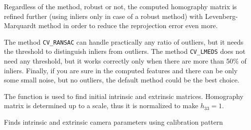 Regardless of the method, robust or not, the computed homography
matrix is refined further (using inliers only in case of a robust
method) with Levenberg-Marquardt method in order to reduce the
reprojection error even more.

The method \texttt{CV\_RANSAC} can handle practically any ratio of outliers,
but it needs the threshold to distinguish inliers from outliers.
The method \texttt{CV\_LMEDS} does not need any threshold, but it works
correctly only when there are more than 50\% of inliers. Finally,
if you are sure in the computed features and there can be only some
small noise, but no outliers, the default method could be the best
choice.

The function is used to find initial intrinsic and extrinsic matrices.
Homography matrix is determined up to a scale, thus it is normalized
to make $h_{33} =1$.

\label{CalibrateCamera2}

Finds intrinsic and extrinsic camera parameters using calibration pattern


